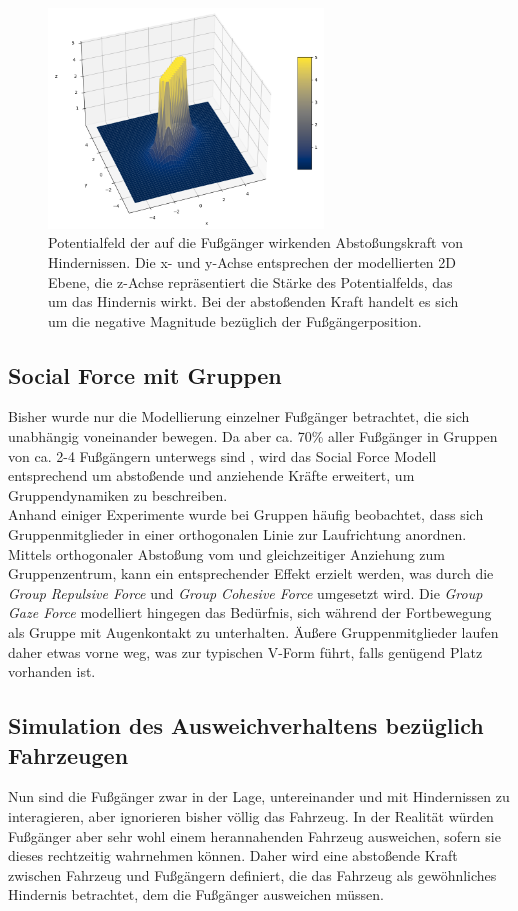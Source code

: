 \begin{figure}[h]
  \centering
  \includegraphics[width = 0.65\textwidth]{imgs/obstacle_repulsive_field}
  \caption{Potentialfeld der auf die Fußgänger wirkenden Abstoßungskraft von Hindernissen.
  Die x- und y-Achse entsprechen der modellierten 2D Ebene, die z-Achse repräsentiert
  die Stärke des Potentialfelds, das um das Hindernis wirkt. Bei der abstoßenden Kraft
  handelt es sich um die negative Magnitude bezüglich der Fußgängerposition.}
  \label{img:ObstacleForce}
\end{figure}

\subsection{Social Force mit Gruppen}
Bisher wurde nur die Modellierung einzelner Fußgänger betrachtet, die sich unabhängig
voneinander bewegen. Da aber ca. 70\% aller Fußgänger in Gruppen von ca. 2-4 Fußgängern
unterwegs sind \cite{moussaid2010groupssf}, wird das Social Force Modell
entsprechend um abstoßende und anziehende Kräfte erweitert, um Gruppendynamiken
zu beschreiben.\\

Anhand einiger Experimente wurde bei Gruppen häufig beobachtet, dass sich Gruppenmitglieder
in einer orthogonalen Linie zur Laufrichtung anordnen. Mittels orthogonaler Abstoßung
vom und gleichzeitiger Anziehung zum Gruppenzentrum, kann ein entsprechender Effekt
erzielt werden, was durch die \emph{Group Repulsive Force} und \emph{Group Cohesive Force}
umgesetzt wird.
Die \emph{Group Gaze Force} modelliert hingegen das Bedürfnis, sich während der Fortbewegung
als Gruppe mit Augenkontakt zu unterhalten. Äußere Gruppenmitglieder laufen daher
etwas vorne weg, was zur typischen V-Form führt, falls genügend Platz vorhanden ist.

\subsection{Simulation des Ausweichverhaltens bezüglich Fahrzeugen}
Nun sind die Fußgänger zwar in der Lage, untereinander und mit Hindernissen
zu interagieren, aber ignorieren bisher völlig das Fahrzeug. In der Realität würden
Fußgänger aber sehr wohl einem herannahenden Fahrzeug ausweichen, sofern sie dieses
rechtzeitig wahrnehmen können. Daher wird eine abstoßende Kraft zwischen Fahrzeug
und Fußgängern definiert, die das Fahrzeug als gewöhnliches Hindernis betrachtet,
dem die Fußgänger ausweichen müssen.\\

